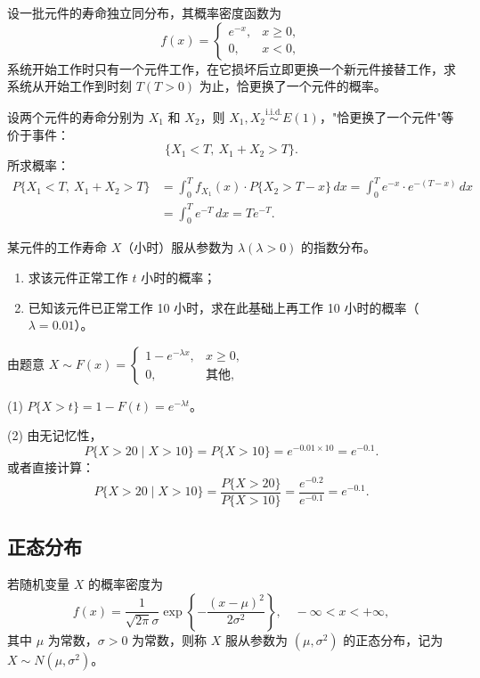 \documentclass[lang=cn,11pt]{elegantbook}
\begin{document}
\begin{exercise}[指数分布与系统更换]
设一批元件的寿命独立同分布，其概率密度函数为
\[
f(x)=
\begin{cases}
e^{-x}, & x\geqslant0, \\[4pt]
0, & x<0,
\end{cases}
\]
系统开始工作时只有一个元件工作，在它损坏后立即更换一个新元件接替工作，求系统从开始工作到时刻 $T(T>0)$ 为止，恰更换了一个元件的概率。
\end{exercise}
\begin{solution}
设两个元件的寿命分别为 $X_1$ 和 $X_2$，则 $X_1, X_2 \stackrel{\text{i.i.d.}}{\sim} E(1)$，"恰更换了一个元件"等价于事件：
\[
\{X_1 < T,\ X_1+X_2 > T\}.
\]
所求概率：
\[
\begin{aligned}
P\{X_1 < T,\ X_1+X_2 > T\} &= \int_0^T f_{X_1}(x)\cdot P\{X_2 > T-x\}\,dx = \int_0^T e^{-x}\cdot e^{-(T-x)}\,dx \\
&= \int_0^T e^{-T}\,dx = Te^{-T}.
\end{aligned}
\]
\end{solution}



\begin{exercise}\label{exer:2-15}
某元件的工作寿命 $X$（小时）服从参数为 $\lambda(\lambda>0)$ 的指数分布。
\begin{enumerate}
    \item[(1)] 求该元件正常工作 $t$ 小时的概率；
    \item[(2)] 已知该元件已正常工作 10 小时，求在此基础上再工作 10 小时的概率（$\lambda=0.01$）。
\end{enumerate}
\end{exercise}
\begin{solution}
由题意 $X \sim F(x) = \begin{cases} 1 - e^{-\lambda x}, & x \ge 0, \\ 0, & \text{其他}, \end{cases}$

(1) $P\{X>t\} = 1 - F(t) = e^{-\lambda t}$。

(2) 由无记忆性，
\[
P\{X>20 \mid X>10\} = P\{X>10\} = e^{-0.01 \times 10} = e^{-0.1}.
\]
或者直接计算：
\[
P\{X>20 \mid X>10\} = \frac{P\{X>20\}}{P\{X>10\}} = \frac{e^{-0.2}}{e^{-0.1}} = e^{-0.1}.
\]
\end{solution}

\subsection{正态分布} \label{subsec:normal-dist}
\begin{definition}[正态分布]\label{def:normal-dist}
若随机变量 $X$ 的概率密度为
\[
f(x) = \frac{1}{\sqrt{2\pi}\sigma} \exp\left\{-\frac{(x-\mu)^2}{2\sigma^2}\right\},\quad -\infty < x < +\infty,
\]
其中 $\mu$ 为常数，$\sigma > 0$ 为常数，则称 $X$ 服从参数为 $(\mu,\sigma^2)$ 的正态分布，记为 $X \sim N(\mu,\sigma^2)$。
\end{definition}
\end{document}
